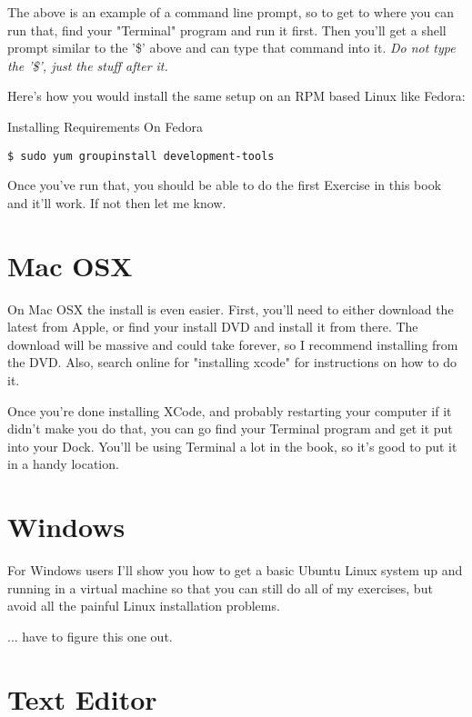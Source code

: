 The above is an example of a command line prompt, so to get to where
you can run that, find your "Terminal" program and run it first.  Then
you'll get a shell prompt similar to the '\$' above and can type that
command into it.  \emph{Do not type the '\$', just the stuff after it.}

Here's how you would install the same setup on an RPM based Linux
like Fedora:

\begin{code}{Installing Requirements On Fedora}
\begin{lstlisting}
$ sudo yum groupinstall development-tools
\end{lstlisting}
\end{code}

Once you've run that, you should be able to do the first Exercise in
this book and it'll work.  If not then let me know.


\section{Mac OSX}

On Mac OSX the install is even easier.  First, you'll need to either 
download the latest  from Apple, or find your install
DVD and install it from there.  The download will be massive and could
take forever, so I recommend installing from the DVD.  Also, search
online for "installing xcode" for instructions on how to do it.

Once you're done installing XCode, and probably restarting your computer
if it didn't make you do that, you can go find your Terminal program
and get it put into your Dock.  You'll be using Terminal a lot in
the book, so it's good to put it in a handy location.


\section{Windows}

For Windows users I'll show you how to get a basic Ubuntu Linux system up and
running in a virtual machine so that you can still do all of my exercises, but
avoid all the painful Linux installation problems.

... have to figure this one out.


\section{Text Editor}

